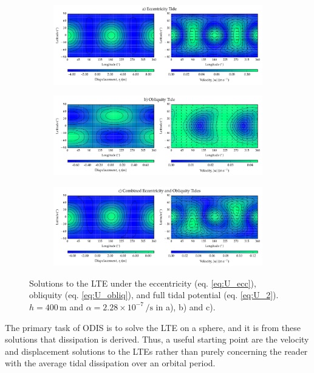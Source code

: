 \begin{figure}[!t]
\begin{subfigure}{\linewidth}
\centering
\includegraphics[width=0.8\linewidth,trim={0 0 0 0.2cm},clip]{Figures/Ecc_test}
\subcaption{\label{fig:LTE_a}}
\end{subfigure}\vspace*{-0.7cm}
\begin{subfigure}{\linewidth}
\centering
\includegraphics[width=0.8\linewidth]{Figures/Obliq_test}
\subcaption{\label{fig:LTE_b}}
\end{subfigure}\vspace*{-0.7cm}
\begin{subfigure}{\linewidth}
\centering
\includegraphics[width=0.8\linewidth]{Figures/Full_test}
\subcaption{\label{fig:LTE_c}}
\end{subfigure}\vspace*{-0.8cm}
\caption{Solutions to the LTE under the eccentricity (eq. \ref{eq:U_ecc}), obliquity (eq. \ref{eq:U_obliq}), and full tidal potential (eq. \ref{eq:U_2}). $h = 400 \, \si{\metre}$ and $\alpha = 2.28 \times 10^{-7} \, \si{\per\second}$ in a), b) and c).\label{fig:LTE_solns}}
\end{figure}

The primary task of ODIS is to solve the LTE on a sphere, and it is from these solutions that dissipation is derived. Thus, a useful starting point are the velocity and displacement solutions to the LTEs rather than purely concerning the reader with the average tidal dissipation over an orbital period. 

